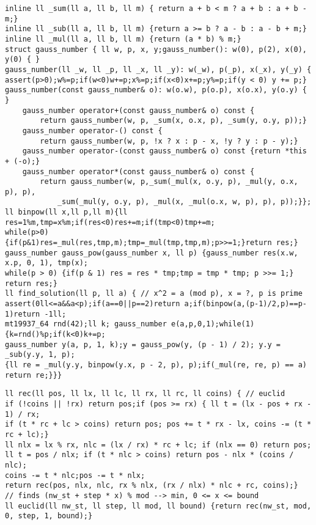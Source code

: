 \documentclass[12pt]{article}
\begin{document}
\begin{verbatim}
inline ll _sum(ll a, ll b, ll m) { return a + b < m ? a + b : a + b - m;}
inline ll _sub(ll a, ll b, ll m) {return a >= b ? a - b : a - b + m;}
inline ll _mul(ll a, ll b, ll m) {return (a * b) % m;}
struct gauss_number { ll w, p, x, y;gauss_number(): w(0), p(2), x(0), y(0) { }
gauss_number(ll _w, ll _p, ll _x, ll _y): w(_w), p(_p), x(_x), y(_y) {
assert(p>0);w%=p;if(w<0)w+=p;x%=p;if(x<0)x+=p;y%=p;if(y < 0) y += p;}
gauss_number(const gauss_number& o): w(o.w), p(o.p), x(o.x), y(o.y) { }
    gauss_number operator+(const gauss_number& o) const {
        return gauss_number(w, p, _sum(x, o.x, p), _sum(y, o.y, p));}
    gauss_number operator-() const {
        return gauss_number(w, p, !x ? x : p - x, !y ? y : p - y);}
    gauss_number operator-(const gauss_number& o) const {return *this + (-o);}
    gauss_number operator*(const gauss_number& o) const {
        return gauss_number(w, p,_sum(_mul(x, o.y, p), _mul(y, o.x, p), p),
            _sum(_mul(y, o.y, p), _mul(x, _mul(o.x, w, p), p), p));}};
ll binpow(ll x,ll p,ll m){ll res=1%m,tmp=x%m;if(res<0)res+=m;if(tmp<0)tmp+=m;
while(p>0){if(p&1)res=_mul(res,tmp,m);tmp=_mul(tmp,tmp,m);p>>=1;}return res;}
gauss_number gauss_pow(gauss_number x, ll p) {gauss_number res(x.w, x.p, 0, 1), tmp(x);
while(p > 0) {if(p & 1) res = res * tmp;tmp = tmp * tmp; p >>= 1;} return res;}
ll find_solution(ll p, ll a) { // x^2 = a (mod p), x = ?, p is prime
assert(0ll<=a&&a<p);if(a==0||p==2)return a;if(binpow(a,(p-1)/2,p)==p-1)return -1ll;
mt19937_64 rnd(42);ll k; gauss_number e(a,p,0,1);while(1){k=rnd()%p;if(k<0)k+=p;
gauss_number y(a, p, 1, k);y = gauss_pow(y, (p - 1) / 2); y.y = _sub(y.y, 1, p);
{ll re = _mul(y.y, binpow(y.x, p - 2, p), p);if(_mul(re, re, p) == a) return re;}}}
\end{verbatim}

\begin{verbatim}
ll rec(ll pos, ll lx, ll lc, ll rx, ll rc, ll coins) { // euclid
if (!coins || !rx) return pos;if (pos >= rx) { ll t = (lx - pos + rx - 1) / rx;
if (t * rc + lc > coins) return pos; pos += t * rx - lx, coins -= (t * rc + lc);}
ll nlx = lx % rx, nlc = (lx / rx) * rc + lc; if (nlx == 0) return pos;
ll t = pos / nlx; if (t * nlc > coins) return pos - nlx * (coins / nlc);
coins -= t * nlc;pos -= t * nlx;
return rec(pos, nlx, nlc, rx % nlx, (rx / nlx) * nlc + rc, coins);}
// finds (nw_st + step * x) % mod --> min, 0 <= x <= bound
ll euclid(ll nw_st, ll step, ll mod, ll bound) {return rec(nw_st, mod, 0, step, 1, bound);}
\end{verbatim}
\end{document}
